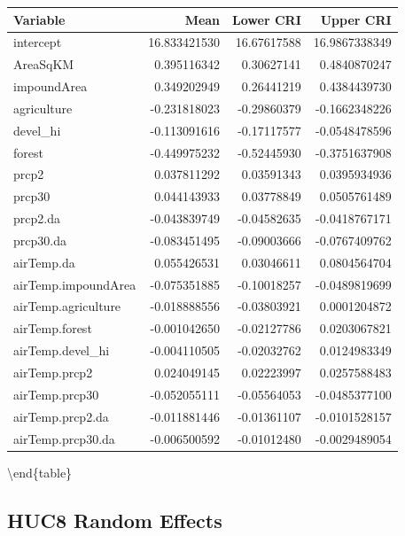 \documentclass[]{book}
\begin{document}
\begin{tabular}[t]{l|r|r|r}
\hline
Variable & Mean & Lower CRI & Upper CRI\\
\hline
intercept & 16.833421530 & 16.67617588 & 16.9867338349\\
\hline
AreaSqKM & 0.395116342 & 0.30627141 & 0.4840870247\\
\hline
impoundArea & 0.349202949 & 0.26441219 & 0.4384439730\\
\hline
agriculture & -0.231818023 & -0.29860379 & -0.1662348226\\
\hline
devel\_hi & -0.113091616 & -0.17117577 & -0.0548478596\\
\hline
forest & -0.449975232 & -0.52445930 & -0.3751637908\\
\hline
prcp2 & 0.037811292 & 0.03591343 & 0.0395934936\\
\hline
prcp30 & 0.044143933 & 0.03778849 & 0.0505761489\\
\hline
prcp2.da & -0.043839749 & -0.04582635 & -0.0418767171\\
\hline
prcp30.da & -0.083451495 & -0.09003666 & -0.0767409762\\
\hline
airTemp.da & 0.055426531 & 0.03046611 & 0.0804564704\\
\hline
airTemp.impoundArea & -0.075351885 & -0.10018257 & -0.0489819699\\
\hline
airTemp.agriculture & -0.018888556 & -0.03803921 & 0.0001204872\\
\hline
airTemp.forest & -0.001042650 & -0.02127786 & 0.0203067821\\
\hline
airTemp.devel\_hi & -0.004110505 & -0.02032762 & 0.0124983349\\
\hline
airTemp.prcp2 & 0.024049145 & 0.02223997 & 0.0257588483\\
\hline
airTemp.prcp30 & -0.052055111 & -0.05564053 & -0.0485377100\\
\hline
airTemp.prcp2.da & -0.011881446 & -0.01361107 & -0.0101528157\\
\hline
airTemp.prcp30.da & -0.006500592 & -0.01012480 & -0.0029489054\\
\hline
\end{tabular}

\textbackslash{}end\{table\}

\hypertarget{huc8-random-effects}{%
\subsection{HUC8 Random Effects}\label{huc8-random-effects}}
\end{document}
